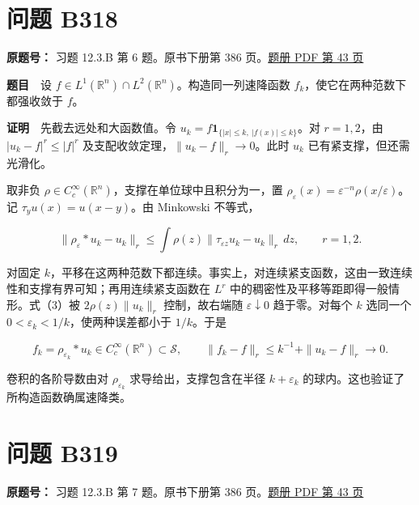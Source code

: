 \documentclass[11pt,a4paper]{article}
\begin{document}
\section{问题 B318}\label{ux95eeux9898-b318}

\textbf{原题号：} 习题 12.3.B 第 6 题。原书下册第 386
页。\href{https://zj139.github.io/math-notes/files/problems/楼分析习题-v2.pdf\#page=43}{题册
PDF 第 43 页}

\textbf{题目}　设
\(f\in L^1(\mathbb R^n)\cap L^2(\mathbb R^n)\)。构造同一列速降函数
\(f_k\)，使它在两种范数下都强收敛于 \(f\)。

\textbf{证明}　先截去远处和大函数值。令
\(u_k=f\mathbf1_{\{|x|\le k,\ |f(x)|\le k\}}\)。对 \(r=1,2\)，由
\(|u_k-f|^r\le |f|^r\) 及支配收敛定理，\(\|u_k-f\|_r\to0\)。此时 \(u_k\)
已有紧支撑，但还需光滑化。

取非负 \(\rho\in C_c^\infty(\mathbb R^n)\)，支撑在单位球中且积分为一，置
\(\rho_\varepsilon(x)=\varepsilon^{-n}\rho(x/\varepsilon)\)。记
\(\tau_yu(x)=u(x-y)\)。由 Minkowski 不等式，

\begin{equation}
\|\rho_\varepsilon*u_k-u_k\|_r
\leq\int \rho(z)\|\tau_{\varepsilon z}u_k-u_k\|_r\,dz,
\qquad r=1,2 .\tag{3}
\end{equation}

对固定
\(k\)，平移在这两种范数下都连续。事实上，对连续紧支函数，这由一致连续性和支撑有界可知；再用连续紧支函数在
\(L^r\) 中的稠密性及平移等距即得一般情形。式（3）被
\(2\rho(z)\|u_k\|_r\) 控制，故右端随 \(\varepsilon\downarrow0\)
趋于零。对每个 \(k\) 选同一个 \(0<\varepsilon_k<1/k\)，使两种误差都小于
\(1/k\)。于是

\begin{equation}
f_k=\rho_{\varepsilon_k}*u_k\in C_c^\infty(\mathbb R^n)\subset\mathcal S,
\qquad \|f_k-f\|_r\leq k^{-1}+\|u_k-f\|_r\longrightarrow0 .\tag{4}
\end{equation}

卷积的各阶导数由对 \(\rho_{\varepsilon_k}\) 求导给出，支撑包含在半径
\(k+\varepsilon_k\) 的球内。这也验证了所构造函数确属速降类。

\section{问题 B319}\label{ux95eeux9898-b319}

\textbf{原题号：} 习题 12.3.B 第 7 题。原书下册第 386
页。\href{https://zj139.github.io/math-notes/files/problems/楼分析习题-v2.pdf\#page=43}{题册
PDF 第 43 页}
\end{document}
